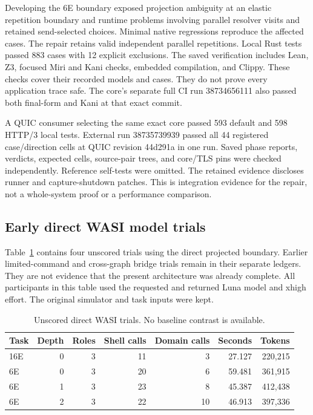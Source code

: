\documentclass[10pt]{article}
\begin{document}
Developing the 6E boundary exposed projection ambiguity at an elastic repetition
boundary and runtime problems involving parallel resolver visits and retained
send-selected choices. Minimal native regressions reproduce the affected cases.
The repair retains valid independent parallel repetitions. Local Rust tests
passed 883 cases with 12 explicit exclusions. The saved verification includes
Lean, Z3, focused Miri and Kani checks, embedded compilation, and Clippy.
These checks cover their recorded models and cases. They do not prove every
application trace safe. The core's separate full CI run 38734656111 also passed
both final-form and Kani at that exact commit.

A QUIC consumer selecting the same exact core passed 593 default and 598 HTTP/3
local tests. External run 38735739939 passed all 44 registered case/direction
cells at QUIC revision 44d291a in one run. Saved phase reports, verdicts,
expected cells, source-pair trees, and core/TLS pins were checked independently.
Reference self-tests were omitted. The retained evidence discloses runner and
capture-shutdown patches. This is integration evidence for the repair, not a
whole-system proof or a performance comparison.

\subsection{Early direct WASI model trials}
Table~\ref{tab:preflight} contains four unscored trials using the direct projected
boundary. Earlier limited-command and cross-graph bridge trials remain in their
separate ledgers. They are not evidence that the present architecture was
already complete. All participants in this table used the requested and returned
Luna model and xhigh effort. The original simulator and task inputs were kept.
\begin{table}[h]
\centering
\caption{Unscored direct WASI trials. No baseline contrast is available.}
\label{tab:preflight}
\begin{tabular}{lrrrrrr}
\toprule
Task & Depth & Roles & Shell calls & Domain calls & Seconds & Tokens \\
\midrule
16E & 0 & 3 & 11 & 3 & 27.127 & 220,215 \\
6E & 0 & 3 & 20 & 6 & 59.481 & 361,915 \\
6E & 1 & 3 & 23 & 8 & 45.387 & 412,438 \\
6E & 2 & 3 & 22 & 10 & 46.913 & 397,336 \\
\bottomrule
\end{tabular}
\end{table}
\end{document}
